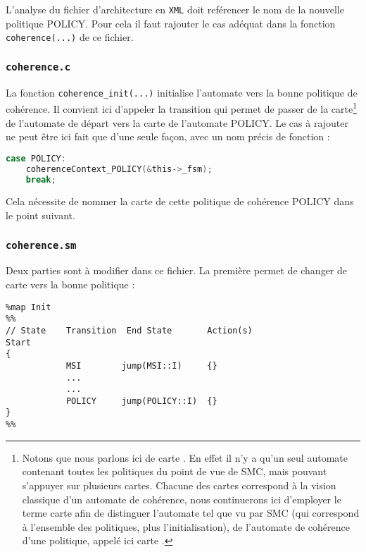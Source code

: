 L'analyse du fichier d'architecture en \texttt{XML} doit reférencer le nom de la nouvelle politique POLICY. Pour cela il faut rajouter le cas adéquat dans la fonction \texttt{coherence(...)} de ce fichier.

\subsubsection{\texttt{coherence.c}}

La fonction \texttt{coherence\_init(...)} initialise l'automate vers la bonne politique de cohérence. Il convient ici d'appeler la transition qui permet de passer de la carte\footnote{Notons que nous parlons ici de \og carte \fg. En effet il n'y a qu'un seul automate contenant toutes les politiques du point de vue de \textsf{SMC}, mais pouvant s'appuyer sur plusieurs cartes. Chacune des cartes correspond à la vision classique d'un automate de cohérence, nous continuerons ici d'employer le terme \og carte \fg afin de distinguer l'automate tel que vu par \textsf{SMC} (qui correspond à l'ensemble des politiques, plus l'initialisation), de l'automate de cohérence d'une politique, appelé ici \og carte \fg.} de l'automate de départ vers la carte de l'automate POLICY. Le cas à rajouter ne peut être ici fait que d'une seule façon, avec un nom précis de fonction :
\begin{framed}
\begin{lstlisting}[frame=none,language=C]
  case POLICY:
    coherenceContext_POLICY(&this->_fsm);
    break;
\end{lstlisting}
\end{framed}
Cela nécessite de nommer la carte de cette politique de cohérence POLICY dans le point suivant.

\subsubsection{\texttt{coherence.sm}}


Deux parties sont à modifier dans ce fichier. La première permet de changer de carte vers la bonne politique :
\begin{framed}
\begin{verbatim}
%map Init
%%
// State    Transition  End State       Action(s)
Start
{
            MSI        jump(MSI::I)     {}
            ...
            ...
            POLICY     jump(POLICY::I)  {}
}
%%
\end{verbatim}
\end{framed}

